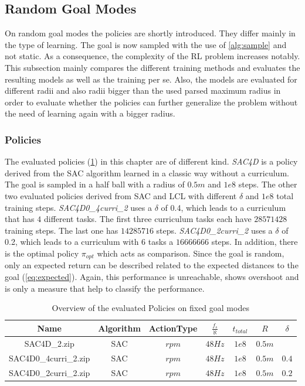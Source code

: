 


\newpage

\subsection{Random Goal Modes}
On random goal modes the policies are shortly introduced. 
They differ mainly in the type of learning. 
The goal is now sampled with the use of \cref{alg:sample} and not static. 
As a consequence, the complexity of the RL problem increases notably. 
This subsection mainly compares the different training methods and evaluates the resulting models as well as the training per se. 
Also, the models are evaluated for different radii and also radii bigger than the used parsed maximum radius in order to evaluate whether the policies 
can further generalize the problem without the need of learning again with a bigger radius.

\subsubsection{Policies}
The evaluated policies (\cref{tab:pi2}) in this chapter are of different kind.
\emph{SAC4D} is a policy derived from the SAC algorithm learned in a classic way 
without a curriculum. The goal is sampled in a half ball with a radius of $0.5m$ and $1e8$ steps.
The other two evaluated policies derived from SAC and LCL with different $\delta$ and $1e8$ total training steps.
\emph{SAC4D0\_4curri\_2} uses a $\delta$ of 0.4, which leads to a curriculum that has $4$ different tasks.
The first three curriculum tasks each have $28571428$ training steps. The last one has $14285716$ steps.
\emph{SAC4D0\_2curri\_2} uses a $\delta$ of 0.2, which leads to a curriculum with $6$ tasks a $16666666$ steps.
In addition, there is the optimal policy $\pi_{opt}$ which acts as comparison.
Since the goal is random, only an expected return can be described related to the expected 
distances to the goal (\cref{eq:expected}). 
Again, this performance is unreachable, shows overshoot and is only a measure that help to classify
the performance.

\begin{longtable}{|c|c|c|c|c|c|c|}
	\caption{Overview of the evaluated Policies on random goal modes}\label{tab:pi2}\\
	
	\hline
	Name & Algorithm & ActionType & $\frac{f_s}{\aleph}$ & $t_{total}$ & $R$ & $\delta$\\
	\hline
	\endfirsthead
	\caption[]{Overview of the evaluated Policies on fixed goal modes}
	\endhead
	SAC4D\_2.zip & SAC & $rpm$ & $48Hz$ & $1e8$ & $0.5m$ & \\
	\hline
	SAC4D0\_4curri\_2.zip & SAC & $rpm$ & $48Hz$ & $1e8$ & $0.5m$ & $0.4$\\
	\hline
	SAC4D0\_2curri\_2.zip & SAC & $rpm$ & $48Hz$ & $1e8$ & $0.5m$ & $0.2$\\
	\hline
\end{longtable}

